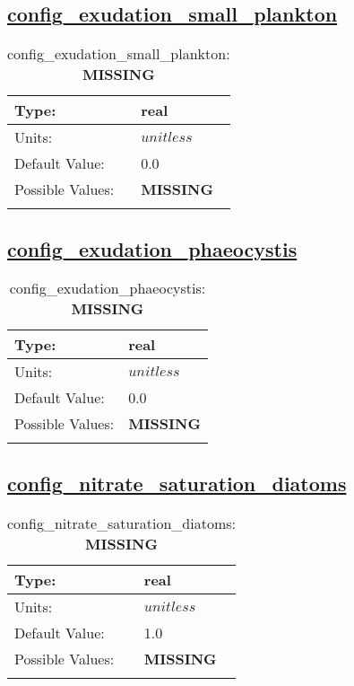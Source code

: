\subsection[config\_exudation\_small\_plankton]{\hyperref[sec:nm_tab_biogeochemistry]{config\_exudation\_small\_plankton}}
\label{subsec:nm_sec_config_exudation_small_plankton}
\begin{center}
\begin{longtable}{| p{2.0in} || p{4.0in} |}
    \hline
    Type: & real \\
    \hline
    Units: & $unitless$ \\
    \hline
    Default Value: & 0.0 \\
    \hline
    Possible Values: & {\bf \color{red} MISSING} \\
    \hline
    \caption{config\_exudation\_small\_plankton: {\bf \color{red} MISSING}}
\end{longtable}
\end{center}
\subsection[config\_exudation\_phaeocystis]{\hyperref[sec:nm_tab_biogeochemistry]{config\_exudation\_phaeocystis}}
\label{subsec:nm_sec_config_exudation_phaeocystis}
\begin{center}
\begin{longtable}{| p{2.0in} || p{4.0in} |}
    \hline
    Type: & real \\
    \hline
    Units: & $unitless$ \\
    \hline
    Default Value: & 0.0 \\
    \hline
    Possible Values: & {\bf \color{red} MISSING} \\
    \hline
    \caption{config\_exudation\_phaeocystis: {\bf \color{red} MISSING}}
\end{longtable}
\end{center}
\subsection[config\_nitrate\_saturation\_diatoms]{\hyperref[sec:nm_tab_biogeochemistry]{config\_nitrate\_saturation\_diatoms}}
\label{subsec:nm_sec_config_nitrate_saturation_diatoms}
\begin{center}
\begin{longtable}{| p{2.0in} || p{4.0in} |}
    \hline
    Type: & real \\
    \hline
    Units: & $unitless$ \\
    \hline
    Default Value: & 1.0 \\
    \hline
    Possible Values: & {\bf \color{red} MISSING} \\
    \hline
    \caption{config\_nitrate\_saturation\_diatoms: {\bf \color{red} MISSING}}
\end{longtable}
\end{center}
